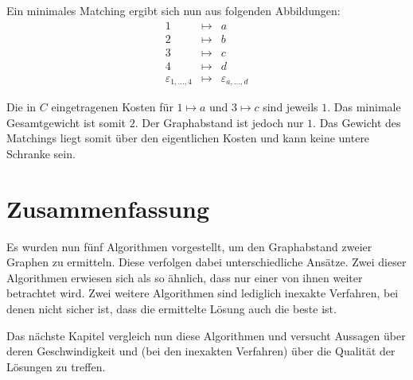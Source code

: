 Ein minimales Matching ergibt sich nun aus folgenden Abbildungen:
\[
\begin{array}{ccc}
	1 & \longmapsto & a \\
  2 & \longmapsto & b \\
  3 & \longmapsto & c \\
  4 & \longmapsto & d \\
	\varepsilon_{1,\ldots,4} & \longmapsto & \varepsilon_{a,\ldots,d}
\end{array}	
\]%


Die in $C$ eingetragenen Kosten für $1 \mapsto a$ und  $3 \mapsto c$ 
sind jeweils $1$. Das minimale Gesamtgewicht ist somit $2$. Der
Graphabstand ist jedoch nur $1$. Das Gewicht des Matchings liegt somit
über den eigentlichen Kosten und kann keine untere Schranke sein.

\section{Zusammenfassung}
Es wurden nun  fünf Algorithmen vorgestellt, um den Graphabstand 
zweier Graphen zu ermitteln. Diese verfolgen dabei unterschiedliche 
Ansätze. Zwei dieser Algorithmen erwiesen sich als 
so ähnlich, dass nur einer von ihnen weiter betrachtet wird. 
Zwei weitere Algorithmen sind lediglich inexakte Verfahren, bei denen nicht sicher ist, 
dass die ermittelte Lösung auch die beste ist.

Das nächste Kapitel vergleich nun diese Algorithmen und versucht Aussagen über 
deren Geschwindigkeit und (bei den inexakten Verfahren) über die Qualität der 
Lösungen zu treffen.